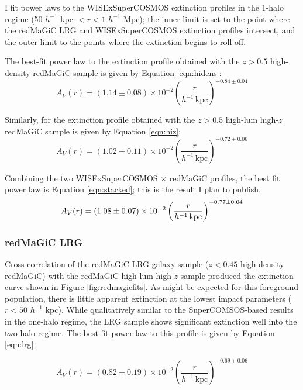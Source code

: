 \documentclass[11pt, oneside]{article}   	%
\newcommand{\hinv}{$h^{-1}$\xspace}
\begin{document}
I fit power laws to the WISExSuperCOSMOS extinction profiles in the 1-halo regime (50 \hinv kpc $ < r < 1$ \hinv Mpc); the inner limit is set to the point where the redMaGiC LRG and WISExSuperCOSMOS extinction profiles intersect, and the outer limit to the points where the extinction begins to roll off. 

The best-fit power law to the extinction profile obtained with the $z > 0.5$ high-density redMaGiC sample is given by Equation \ref{eqn:hidens}: 
\begin{equation}
A_V(r) = \left(1.14 \pm 0.08\right) \times 10^{-2} \left( \frac{r}{h^{-1}\, \mathrm{kpc}} \right)^{-0.84 \pm 0.04}\label{eqn:hidens}
\end{equation}

Similarly, for the extinction profile obtained with the $z > 0.5$ high-lum high-$z$ redMaGiC sample is given by Equation \ref{eqn:hiz}:
\begin{equation}
A_V(r) = \left(1.02 \pm 0.11\right) \times 10^{-2} \left( \frac{r}{h^{-1}\, \mathrm{kpc}} \right)^{-0.72 \pm 0.06}\label{eqn:hiz}
\end{equation}

Combining the two WISExSuperCOSMOS $\times$ redMaGiC profiles, the best fit power law is Equation \ref{eqn:stacked}; this is the result I plan to publish.  
\begin{equation}
A_V(r) = \left(1.08 \pm 0.07\right) \times 10^{-2} \left( \frac{r}{h^{-1}\, {\rm kpc}} \right)^{-0.77 \pm 0.04}\label{eqn:stacked}
\end{equation}



\subsubsection{redMaGiC LRG}

Cross-correlation of the redMaGiC LRG galaxy sample ($z < 0.45$ high-density redMaGiC) with the redMaGiC high-lum high-$z$ sample produced the extinction curve shown in Figure \ref{fig:redmagicfits}. As might be expected for this foreground population, there is little apparent extinction at the lowest impact parameters ($r < 50$ \hinv kpc). While qualitatively similar to the SuperCOMSOS-based results in the one-halo regime, the LRG sample shows significant extinction well into the two-halo regime. The best-fit power law to this profile is given by Equation \ref{eqn:lrg}:

\begin{equation}
A_V(r) = \left(0.82 \pm 0.19\right) \times 10^{-2} \left( \frac{r}{h^{-1}\, \mathrm{kpc}} \right)^{-0.69 \pm 0.06}\label{eqn:lrg}
\end{equation}
\end{document}
